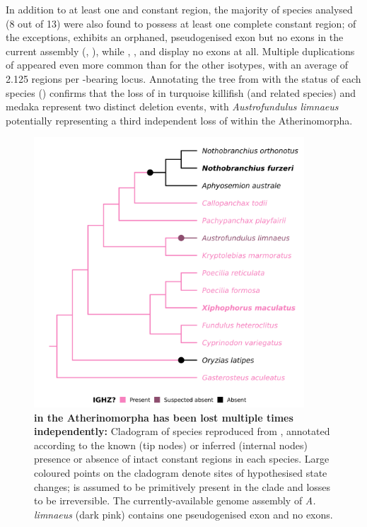 In addition to at least one  and  constant region, the majority of species analysed (8 out of 13) were also found to possess at least one complete  constant region; of the exceptions,  exhibits an orphaned, pseudogenised  exon but no \cz exons in the current assembly (, ), while , , \Nfu and  display no  exons at all. Multiple duplications of  appeared even more common than for the other isotypes, with an average of 2.125 regions per -bearing locus. Annotating the tree from  with the  status of each species () confirms that the loss of  in turquoise killifish (and related species) and medaka represent two distinct deletion events, with \textit{Austrofundulus limnaeus} potentially representing a third independent loss of  within the Atherinomorpha.

\begin{figure}
\centering
\includegraphics[width=0.9\textwidth]{_Figures/png/species-tree-large-ighz}
\caption[ in the Atherinomorpha has been lost multiple times independently]{\textbf{ in the Atherinomorpha has been lost multiple times independently:} Cladogram of species reproduced from , annotated according to the known (tip nodes) or inferred (internal nodes) presence or absence of intact  constant regions in each species. Large coloured points on the cladogram denote sites of hypothesised state changes;  is assumed to be primitively present in the clade and losses to be irreversible. The currently-available genome assembly of \textit{A. limnaeus} (dark pink) contains one pseudogenised  exon and no \cz{} exons.}
\label{fig:species-tree-large-ighz}
\end{figure}

